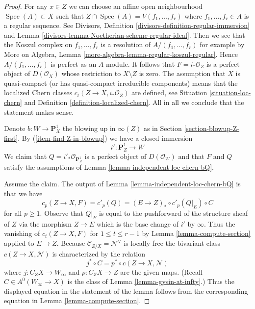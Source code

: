 \documentclass[10pt,a4paper]{amsart}
\theoremstyle{plain}
\theoremstyle{definition}
\theoremstyle{remark}
\numberwithin{equation}{subsection}
\def\Spec{\mathop{\mathrm{Spec}}}
\begin{document}
\begin{proof}
For any $x \in Z$ we can choose an affine open neighbourhood
$\Spec(A) \subset X$ such that $Z \cap \Spec(A) = V(f_1, \ldots, f_r)$
where $f_1, \ldots, f_r \in A$ is a regular sequence.
See Divisors, Definition \ref{divisors-definition-regular-immersion} and
Lemma \ref{divisors-lemma-Noetherian-scheme-regular-ideal}.
Then we see that the Koszul complex on $f_1, \ldots, f_r$ is
a resolution of $A/(f_1, \ldots, f_r)$ for example by
More on Algebra, Lemma \ref{more-algebra-lemma-regular-koszul-regular}.
Hence $A/(f_1, \ldots, f_r)$ is perfect as an $A$-module.
It follows that $F = i_*\mathcal{O}_Z$ is a perfect object of
$D(\mathcal{O}_X)$ whose restriction to $X \setminus Z$ is zero.
The assumption that $X$ is quasi-compact (or has quasi-compact
irreducible components) means that the localized Chern classes
$c_t(Z \to X, i_*\mathcal{O}_Z)$ are defined, see
Situation \ref{situation-loc-chern} and
Definition \ref{definition-localized-chern}. All in all
we conclude that the statement makes sense.

\medskip\noindent
Denote $b : W \to \mathbf{P}^1_X$ the blowing up in $\infty(Z)$
as in Section \ref{section-blowup-Z-first}. By (\ref{item-find-Z-in-blowup})
we have a closed immersion
$$
i' : \mathbf{P}^1_Z \longrightarrow W
$$
We claim that $Q = i'_*\mathcal{O}_{\mathbf{P}^1_Z}$
is a perfect object of
$D(\mathcal{O}_W)$ and that $F$ and $Q$ satisfy the assumptions of
Lemma \ref{lemma-independent-loc-chern-bQ}.

\medskip\noindent
Assume the claim. The output of Lemma \ref{lemma-independent-loc-chern-bQ}
is that we have
$$
c_p(Z \to X, F) = c'_p(Q) = (E \to Z)_* \circ c'_p(Q|_E) \circ C
$$
for all $p \geq 1$. Observe that $Q|_E$ is equal to the pushforward of
the structure sheaf of $Z$ via the morphism $Z \to E$ which is the
base change of $i'$ by $\infty$.
Thus the vanishing of $c_t(Z \to X, F)$ for $1 \leq t \leq r - 1$
by Lemma \ref{lemma-compute-section} applied to $E \to Z$.
Because $\mathcal{C}_{Z/X} = \mathcal{N}^\vee$
is locally free the bivariant class $c(Z \to X, \mathcal{N})$
is characterized by the relation
$$
j^* \circ C = p^* \circ c(Z \to X, \mathcal{N})
$$
where $j : C_ZX \to W_\infty$ and $p : C_ZX \to Z$ are the given maps.
(Recall $C \in A^0(W_\infty \to X)$ is the class of
Lemma \ref{lemma-gysin-at-infty}.)
Thus the displayed equation in the statement of the lemma
follows from the corresponding equation in Lemma \ref{lemma-compute-section}.


\end{proof}
\end{document}

